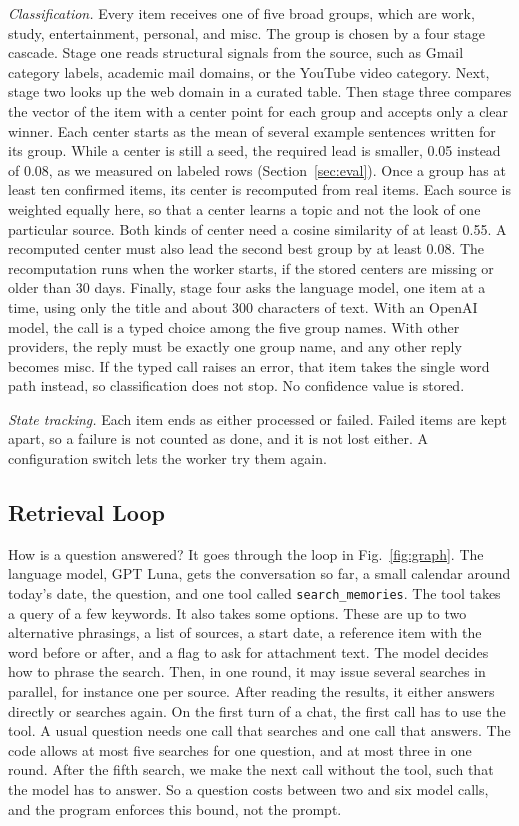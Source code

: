 \documentclass[conference]{IEEEtran}
\newcommand{\llmname}{GPT\nobreakdash-6 Luna}
\begin{document}
\textit{Classification.} Every item receives one of five broad groups, which are work, study, entertainment, personal, and misc. The group is chosen by a four stage cascade. Stage one reads structural signals from the source, such as Gmail category labels, academic mail domains, or the YouTube video category. Next, stage two looks up the web domain in a curated table. Then stage three compares the vector of the item with a center point for each group and accepts only a clear winner. Each center starts as the mean of several example sentences written for its group. While a center is still a seed, the required lead is smaller, 0.05 instead of 0.08, as we measured on labeled rows (Section~\ref{sec:eval}). Once a group has at least ten confirmed items, its center is recomputed from real items. Each source is weighted equally here, so that a center learns a topic and not the look of one particular source. Both kinds of center need a cosine similarity of at least 0.55. A recomputed center must also lead the second best group by at least 0.08. The recomputation runs when the worker starts, if the stored centers are missing or older than 30 days. Finally, stage four asks the language model, one item at a time, using only the title and about 300 characters of text. With an OpenAI model, the call is a typed choice among the five group names. With other providers, the reply must be exactly one group name, and any other reply becomes misc. If the typed call raises an error, that item takes the single word path instead, so classification does not stop. No confidence value is stored.

\textit{State tracking.} Each item ends as either processed or failed. Failed items are kept apart, so a failure is not counted as done, and it is not lost either. A configuration switch lets the worker try them again.

\subsection{Retrieval Loop}
How is a question answered? It goes through the loop in Fig.~\ref{fig:graph}. The language model, \llmname{}, gets the conversation so far, a small calendar around today's date, the question, and one tool called \texttt{search\_memories}. The tool takes a query of a few keywords. It also takes some options. These are up to two alternative phrasings, a list of sources, a start date, a reference item with the word before or after, and a flag to ask for attachment text. The model decides how to phrase the search. Then, in one round, it may issue several searches in parallel, for instance one per source. After reading the results, it either answers directly or searches again. On the first turn of a chat, the first call has to use the tool. A usual question needs one call that searches and one call that answers. The code allows at most five searches for one question, and at most three in one round. After the fifth search, we make the next call without the tool, such that the model has to answer. So a question costs between two and six model calls, and the program enforces this bound, not the prompt.
\end{document}
